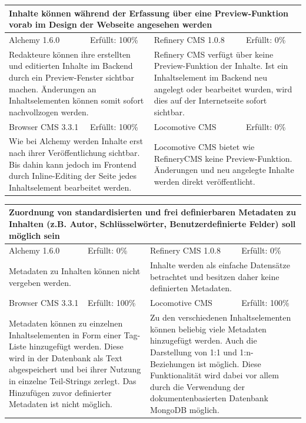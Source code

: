 \begin{tabular}[!ht]{|l|l|l|l|}
\hline
\multicolumn{4}{|p{15cm}|}{\textbf{Inhalte können während der Erfassung über eine Preview-Funktion vorab im Design der Webseite angesehen werden}} \\
\hline
  Alchemy 1.6.0 & \cellcolor{green}Erfüllt: 100\% & Refinery CMS 1.0.8 & \cellcolor{red}Erfüllt: 0\% \\
  \hline
  \multicolumn{2}{|p{7.5cm}|}{Redakteure können ihre erstellten und editierten Inhalte im Backend durch ein Preview-Fenster sichtbar machen. Änderungen an Inhaltselementen können somit sofort nachvollzogen werden.}
   & \multicolumn{2}{p{7.5cm}|}{Refinery CMS verfügt über keine Preview-Funktion der Inhalte. Ist ein Inhaltselement im Backend neu angelegt oder bearbeitet wurden, wird dies auf der Internetseite sofort sichtbar.} \\
  \hline
  Browser CMS 3.3.1 & \cellcolor{green}Erfüllt: 100\% & Locomotive CMS & \cellcolor{red}Erfüllt: 0\% \\
  \hline
  \multicolumn{2}{|p{7.5cm}|}{Wie bei Alchemy werden Inhalte erst nach ihrer Veröffentlichung sichtbar. Bis dahin kann jedoch im Frontend durch Inline-Editing der Seite jedes Inhaltselement bearbeitet werden.} & \multicolumn{2}{p{7.5cm}|}{Locomotive CMS bietet wie RefineryCMS keine Preview-Funktion. Änderungen und neu angelegte Inhalte werden direkt veröffentlicht.} \\
\hline
\end{tabular}
\newline
\newline
\newline
\begin{tabular}[!ht]{|l|l|l|l|}
\hline
\multicolumn{4}{|p{15cm}|}{\textbf{Zuordnung von standardisierten und frei definierbaren Metadaten zu Inhalten (z.B. Autor, Schlüsselwörter, Benutzerdefinierte Felder) soll möglich sein}} \\
\hline
  Alchemy 1.6.0 & \cellcolor{red}Erfüllt: 0\% & Refinery CMS 1.0.8 & \cellcolor{red}Erfüllt: 0\% \\
  \hline
  \multicolumn{2}{|p{7.5cm}|}{Metadaten zu Inhalten können nicht vergeben werden.}
   & \multicolumn{2}{p{7.5cm}|}{Inhalte werden als einfache Datensätze betrachtet und besitzen daher keine definierten Metadaten.} \\
  \hline
  Browser CMS 3.3.1 & \cellcolor{green}Erfüllt: 100\% & Locomotive CMS & \cellcolor{green}Erfüllt: 100\% \\
  \hline
  \multicolumn{2}{|p{7.5cm}|}{Metadaten können zu einzelnen Inhaltselementen in Form einer Tag-Liste hinzugefügt werden. Diese wird in der Datenbank als Text abgespeichert und bei ihrer Nutzung in einzelne Teil-Strings zerlegt. Das Hinzufügen zuvor definierter Metadaten ist nicht möglich.} & \multicolumn{2}{p{7.5cm}|}{Zu den verschiedenen Inhaltselementen können beliebig viele Metadaten hinzugefügt werden. Auch die Darstellung von 1:1 und 1:n-Beziehungen ist möglich. Diese Funktionalität wird dabei vor allem durch die Verwendung der dokumentenbasierten Datenbank MongoDB möglich.} \\
\hline
\end{tabular}
